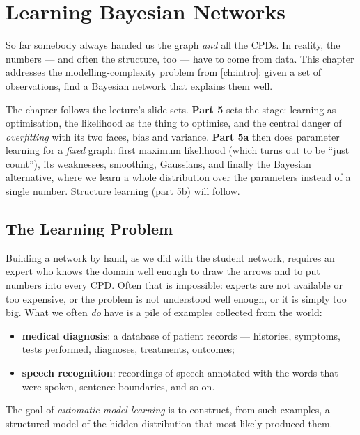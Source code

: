 \documentclass[11pt, oneside]{book}
\let\originalsection\section
\renewcommand{\section}{\Needspace{7\baselineskip}\originalsection}
\begin{document}
\chapter{Learning Bayesian Networks}
\label{ch:learning}

So far somebody always handed us the graph \emph{and} all the CPDs. In
reality, the numbers --- and often the structure, too --- have to come from
data. This chapter addresses the modelling-complexity problem from
\cref{ch:intro}: given a set of observations, find a Bayesian network that
explains them well.

The chapter follows the lecture's slide sets. \textbf{Part 5} sets the stage:
learning as optimisation, the likelihood as the thing to optimise, and the
central danger of \emph{overfitting} with its two faces, bias and variance.
\textbf{Part 5a} then does parameter learning for a \emph{fixed} graph: first
maximum likelihood (which turns out to be ``just count''), its weaknesses,
smoothing, Gaussians, and finally the Bayesian alternative, where we learn a
whole distribution over the parameters instead of a single number.
Structure learning (part 5b) will follow.

\section{The Learning Problem}
\label{sec:learning-problem}

Building a network by hand, as we did with the student network, requires an
expert who knows the domain well enough to draw the arrows and to put numbers
into every CPD. Often that is impossible: experts are not available or too
expensive, or the problem is not understood well enough, or it is simply too
big. What we often \emph{do} have is a pile of examples collected from the
world:
\begin{itemize}
  \item \textbf{medical diagnosis}: a database of patient records --- histories,
    symptoms, tests performed, diagnoses, treatments, outcomes;
  \item \textbf{speech recognition}: recordings of speech annotated with the
    words that were spoken, sentence boundaries, and so on.
\end{itemize}
The goal of \emph{automatic model learning} is to construct, from such
examples, a structured model of the hidden distribution that most likely
produced them.
\end{document}
